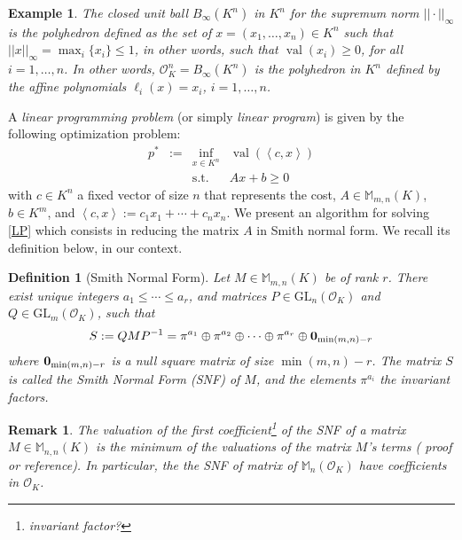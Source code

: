 \documentclass[a4paper,12pt]{article}
\newtheorem{definition}{Definition}
\newtheorem{remark}{Remark}
\newtheorem{example}{Example}
\newcommand{\allmat}{\mathbb{M}} %
\newcommand{\simone}[1]{{\color{blue} #1}} %
\DeclareMathOperator{\val}{val}
\newcommand{\OK}{\mathcal{O}_K}
\newcommand{\GL}{\mathrm{GL}}
\begin{document}
\begin{example}
  The closed unit ball $B_\infty(K^n)$ in $K^n$ for the supremum norm $||\cdot||_{\infty}$ is the
  polyhedron defined as the set of $x=(x_1,\ldots,x_n) \in K^n$ such that $||x||_{\infty} =
  \max_i\{x_i\} \leq 1$, in other words, such that $\val(x_i) \geq 0$, for all $i=1, \ldots, n$.
  In other words, $\OK^n = B_\infty(K^n)$ is the polyhedron in $K^n$ defined by the affine polynomials
  $\ell_i(x)=x_i$, $i=1,\ldots, n$.
\end{example}


A {\it linear programming problem} (or simply {\it linear program}) is given by the following
optimization problem:
\begin{equation}
  \tag{LP}\label{LP}
\begin{array}{rcll}
  p^* & := & \inf_{x \in K^n} & \val(\left\langle c, x \right\rangle) \\
  &    & \text{s.t.}         & A x + b \geq 0
\end{array}
\end{equation}
with $c \in K^n$ a fixed vector of size $n$ that represents the cost, $A \in \allmat_{m,n}(K)$, $b \in K^m$,
and $\left\langle c, x \right\rangle := c_1x_1+\cdots +c_nx_n$.
We present an algorithm for solving \eqref{LP} which consists in reducing the matrix $A$ in Smith normal form.
We recall its definition below, in our context.

\begin{definition}[Smith Normal Form]\label{smith_nf}
  Let $M \in \allmat_{m,n}(K)$ be of rank $r$. There exist unique integers $a_1 \leq \cdots \leq a_r$, and
  matrices $P \in \GL_n(\OK)$ and $Q \in \GL_m(\OK)$, such that
  $$
  S := QMP^{-1} = \pi^{a_1} \oplus \pi^{a_2} \oplus \cdots \oplus \pi^{a_r} \oplus {\bf 0}_{\min(m,n)-r}
  $$
  where ${\bf 0}_{\min(m,n)-r}$ is a null square matrix of size $\min(m,n)-r$.
  The matrix $S$ is called the \emph{Smith Normal Form (SNF)} of $M$, and the elements $\pi^{a_i}$ the
  \emph{invariant factors}.
\end{definition}
\begin{remark}
  The valuation of the first coefficient\footnote{invariant factor?} of the SNF of a matrix
  $M \in \allmat_{n,n} \left( K \right) $ is the minimum of the valuations of the matrix
  $M$'s terms (\simone{proof or reference}). In particular, the the SNF of matrix of $\allmat_n \left( \OK \right) $ have coefficients in $\OK$.
\end{remark}
\end{document}
